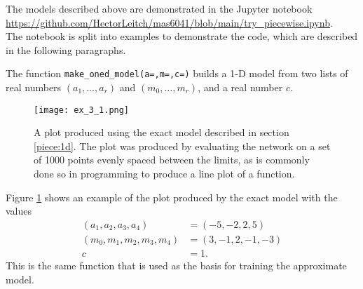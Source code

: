\documentclass{somasmsc}
\begin{document}
The models described above are demonstrated in the Jupyter notebook \url{https://github.com/HectorLeitch/mas6041/blob/main/try_piecewise.ipynb}. \\ The notebook is split into examples to demonstrate the code, which are described in the following paragraphs.

\begin{exa}
The function \verb|make_oned_model(a=,m=,c=)| builds a 1-D model from two lists of real numbers $\left(a_1, \dots, a_r\right)$ and $\left(m_0, \dots, m_r\right)$, and a real number $c$.

\begin{figure}[H]\label{piece:ex_3_1}
\begin{center}
\texttt{[image: ex\_3\_1.png]}
\end{center}
\caption{A plot produced using the exact model described in section \ref{piece:1d}. The plot was produced by evaluating the network on a set of 1000 points evenly spaced between the limits, as is commonly done so in programming to produce a line plot of a function.}
\end{figure}

Figure \ref{piece:ex_3_1} shows an example of the plot produced by the exact model with the values
\begin{align*}
    \left(a_1, a_2, a_3, a_4\right) &= \left(-5, -2, 2, 5\right) \\
    \left(m_0, m_1, m_2, m_3, m_4\right) &= \left(3, -1, 2, -1, -3\right) \\
    c &= 1.
\end{align*}
This is the same function that is used as the basis for training the approximate model.
\end{exa}
\end{document}
